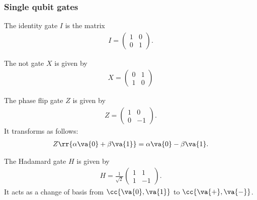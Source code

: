 \documentclass{article}
\begin{document}
\subsubsection{Single qubit gates}
\label{sec:single-qubit-gates}

\begin{definition}
  \label{def:identity}
  The identity gate $I$ is the matrix
  \begin{align*}
    I = \begin{pmatrix}
      1 & 0 \\ 0 & 1
    \end{pmatrix}.
  \end{align*}
\end{definition}

\begin{definition}
  \label{def:not}
  The not gate $X$ is given by
  \begin{align*}
    X = \begin{pmatrix}
      0 & 1 \\ 1 & 0
    \end{pmatrix}
  \end{align*}
\end{definition}

\begin{definition}
  \label{def:phase-flip}
  The phase flip gate $Z$ is given by
  \begin{align*}
    Z = \begin{pmatrix} 1 & 0 \\ 0 & -1 \end{pmatrix}.
  \end{align*}
  It transforms as follows:
  \begin{align*}
    Z \rr{\alpha\va{0} + \beta\va{1}} = \alpha\va{0} - \beta\va{1}.
  \end{align*}
\end{definition}


\begin{definition}
  \label{def:hadamard}
  The Hadamard gate $H$ is given by
  \begin{align*}
    H = \frac{1}{\sqrt{2}} \begin{pmatrix} 1 & 1 \\ 1 & -1 \end{pmatrix}.
  \end{align*}
  It acts as a change of basis from $ \cc{ \va{ 0 }, \va{ 1 } } $ to $ \cc{ \va{ + }, \va{ - } }$.
\end{definition}
\end{document}
